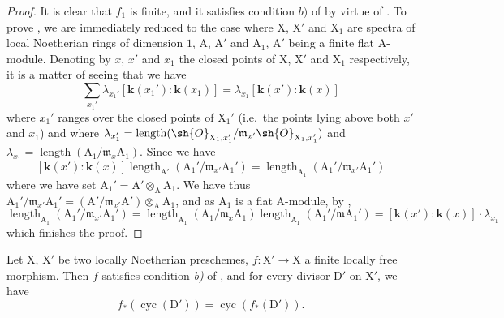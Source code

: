 \begin{proof}
It is clear that $f_1$ is finite, and it satisfies condition $b)$ of  by virtue of .
To prove , we are immediately reduced to the case where $\mathrm{X}$, $\mathrm{X}'$ and $\mathrm{X}_1$ are spectra of local Noetherian rings of dimension $1$, $\mathrm{A}$, $\mathrm{A}'$ and $\mathrm{A}_1$, $\mathrm{A}'$ being a finite flat A-module.
Denoting by $x$, $x'$ and $x_1$ the closed points of $\mathrm{X}$, $\mathrm{X}'$ and $\mathrm{X}_1$ respectively, it is a matter of seeing that we have
\[
\label{IV.21.10.16.2}
  \sum_{x_1'}\lambda_{x_1'}[\boldsymbol{k}(x_1'):\boldsymbol{k}(x_1)]=\lambda_{x_1}[\boldsymbol{k}(x'):\boldsymbol{k}(x)]
  \tag{21.10.16.2}
\]
where $x_1'$ ranges over the closed points of $\mathrm{X}_1'$ (i.e.\ the points lying above both $x'$ and $x_1$) and where $\lambda_{x_1'}=\operatorname{length}(\sh{O}_{\mathrm{X}_1,x_1'}/\mathfrak{m}_{x'}\sh{O}_{\mathrm{X}_1,x_1'})$ and $\lambda_{x_1}=\operatorname{length}(\mathrm{A}_1/\mathfrak{m}_x\mathrm{A}_1)$.
Since we have
\[
  [\boldsymbol{k}(x'):\boldsymbol{k}(x)]\operatorname{length}_{\mathrm{A}'}(\mathrm{A}_1'/\mathfrak{m}_{x'}\mathrm{A}_1')=\operatorname{length}_{\mathrm{A}_1}(\mathrm{A}_1'/\mathfrak{m}_{x'}\mathrm{A}_1')
\]
where we have set $\mathrm{A}_1'=\mathrm{A}'\otimes_{\mathrm{A}}\mathrm{A}_1$.
We have thus $\mathrm{A}_1'/\mathfrak{m}_{x'}\mathrm{A}_1'=(\mathrm{A}'/\mathfrak{m}_{x'}\mathrm{A}')\otimes_{\mathrm{A}}\mathrm{A}_1$, and as $\mathrm{A}_1$ is a flat A-module, by ,
\[
  \operatorname{length}_{\mathrm{A}_1}(\mathrm{A}_1'/\mathfrak{m}_{x'}\mathrm{A}_1')=\operatorname{length}_{\mathrm{A}_1}(\mathrm{A}_1/\mathfrak{m}_x\mathrm{A}_1)\operatorname{length}_{\mathrm{A}_1}(\mathrm{A}_1'/\mathfrak{m}\mathrm{A}_1')
  =[\boldsymbol{k}(x'):\boldsymbol{k}(x)]\cdot\lambda_{x_1}
\]
which finishes the proof.
\end{proof}

\begin{proposition}[21.10.17]
\label{IV.21.10.17}
Let $\mathrm{X}$, $\mathrm{X}'$ be two locally Noetherian preschemes, $f:\mathrm{X}'\to\mathrm{X}$ a finite locally free morphism.
Then $f$ satisfies condition \emph{b)} of , and for every divisor $\mathrm{D}'$ on $\mathrm{X}'$, we have
\[
\label{IV.21.10.17.1}
  f_*(\operatorname{cyc}(\mathrm{D}'))=\operatorname{cyc}(f_*(\mathrm{D}')).
  \tag{21.10.17.1}
\]
\end{proposition}

